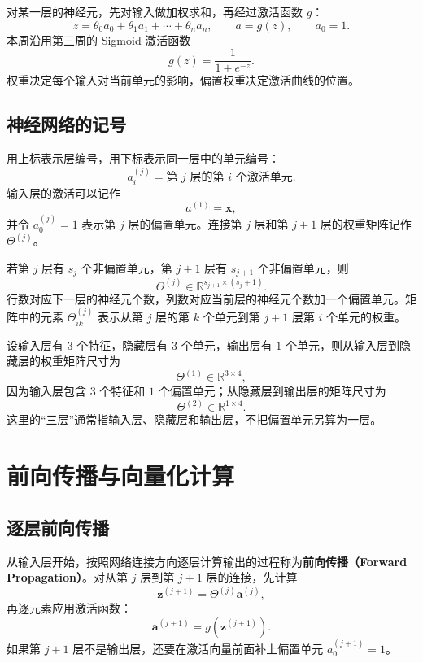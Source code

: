 \documentclass[12pt,a4paper]{ctexart}
\newcommand{\concept}[1]{\textbf{\textcolor{DefineColor}{#1}}}
\begin{document}
\begin{keybox}[单个神经元的计算]
对某一层的神经元，先对输入做加权求和，再经过激活函数 $g$：
\[
  z=\theta_0a_0+\theta_1a_1+\cdots+\theta_na_n,
  \qquad
  a=g(z),
  \qquad a_0=1.
\]
本周沿用第三周的 Sigmoid 激活函数
\[
  g(z)=\frac{1}{1+e^{-z}}.
\]
权重决定每个输入对当前单元的影响，偏置权重决定激活曲线的位置。
\end{keybox}

\subsection{神经网络的记号}

\begin{definitionbox}[层编号与激活单元]
用上标表示层编号，用下标表示同一层中的单元编号：
\[
  a_i^{(j)}=\text{第 }j\text{ 层的第 }i\text{ 个激活单元}.
\]
输入层的激活可以记作
\[
  a^{(1)}=\mathbf{x},
\]
并令 $a_0^{(j)}=1$ 表示第 $j$ 层的偏置单元。连接第 $j$ 层和第 $j+1$ 层的权重矩阵记作 $\Theta^{(j)}$。
\end{definitionbox}

\begin{keybox}[权重矩阵的尺寸]
若第 $j$ 层有 $s_j$ 个非偏置单元，第 $j+1$ 层有 $s_{j+1}$ 个非偏置单元，则
\[
  \Theta^{(j)}\in\mathbb{R}^{s_{j+1}\times(s_j+1)}.
\]
行数对应下一层的神经元个数，列数对应当前层的神经元个数加一个偏置单元。矩阵中的元素 $\Theta_{ik}^{(j)}$ 表示从第 $j$ 层的第 $k$ 个单元到第 $j+1$ 层第 $i$ 个单元的权重。
\end{keybox}

\begin{examplebox}[三层网络的结构]
设输入层有 $3$ 个特征，隐藏层有 $3$ 个单元，输出层有 $1$ 个单元，则从输入层到隐藏层的权重矩阵尺寸为
\[
  \Theta^{(1)}\in\mathbb{R}^{3\times4},
\]
因为输入层包含 $3$ 个特征和 $1$ 个偏置单元；从隐藏层到输出层的矩阵尺寸为
\[
  \Theta^{(2)}\in\mathbb{R}^{1\times4}.
\]
这里的“三层”通常指输入层、隐藏层和输出层，不把偏置单元另算为一层。
\end{examplebox}

\section{前向传播与向量化计算}

\subsection{逐层前向传播}

\begin{definitionbox}[前向传播]
从输入层开始，按照网络连接方向逐层计算输出的过程称为\concept{前向传播（Forward Propagation）}。对从第 $j$ 层到第 $j+1$ 层的连接，先计算
\[
  \mathbf{z}^{(j+1)}=\Theta^{(j)}\mathbf{a}^{(j)},
\]
再逐元素应用激活函数：
\[
  \mathbf{a}^{(j+1)}=g\!\left(\mathbf{z}^{(j+1)}\right).
\]
如果第 $j+1$ 层不是输出层，还要在激活向量前面补上偏置单元 $a_0^{(j+1)}=1$。
\end{definitionbox}
\end{document}
